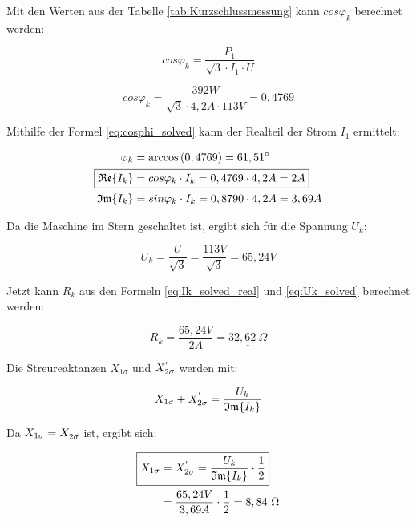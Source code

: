 \documentclass[conference]{IEEEtran}
\begin{document}
Mit den Werten aus der Tabelle \ref{tab:Kurzschlussmessung} kann $cos\varphi_k$ berechnet werden:

\begin{equation}
    \boxed{cos\varphi_k = \frac{P_1}{\sqrt{3} \cdot I_1 \cdot U}}
\end{equation}

\begin{equation} \label{eq:cosphi_solved}
    cos\varphi_k = \frac{392 W}{\sqrt{3} \cdot 4,2 A \cdot 113 V} = 0,4769
\end{equation}

Mithilfe der Formel \ref{eq:cosphi_solved} kann der Realteil der Strom $I_1$ ermittelt:

\begin{align} \label{eq:Ik_solved_real}
    \varphi_k                      & = \arccos\left(0,4769\right) = 61,51^\circ             \\
    \Aboxed{\mathfrak{Re}\{I_k\} & = cos\varphi_k \cdot I_k = 0,4769 \cdot 4,2 A = 2A}    \\
    \mathfrak{Im}\{I_k\}         & = sin\varphi_k \cdot I_k = 0,8790 \cdot 4,2 A = 3,69 A
\end{align}

Da die Maschine im Stern geschaltet ist, ergibt sich für die Spannung $U_k$:

\begin{equation} \label{eq:Uk_solved}
    \boxed{U_k = \frac{U}{\sqrt{3}}} = \frac{113 V}{\sqrt{3}} = 65,24 V
\end{equation}

Jetzt kann $R_k$ aus den Formeln \ref{eq:Ik_solved_real} und \ref{eq:Uk_solved} berechnet werden:

\begin{equation} \label{eq:Kurzschlusswiderstand_calc}
    \boxed{R_k = \frac{65,24V}{2A} = \underline{32,62\ \Omega}}
\end{equation}

Die Streureaktanzen $X_{1\sigma}$ und $X_{2\sigma}^\text{\textquotesingle}$ werden mit:

\begin{equation} \label{eq:Streureaktanzen}
    X_{1\sigma} + X_{2\sigma}^\text{\textquotesingle} = \frac{U_k}{\mathfrak{Im}\{I_k\}}
\end{equation}

Da $X_{1\sigma} = X_{2\sigma}^\text{\textquotesingle}$ ist, ergibt sich:

\begin{align} \label{eq:Streureaktanzen_solved}
    \Aboxed{X_{1\sigma} & = X_{2\sigma}^\text{\textquotesingle} = \frac{U_k}{\mathfrak{Im}\{I_k\}}\cdot\frac{1}{2}} \\
                        & = \frac{65,24V}{3,69A}\cdot\frac{1}{2} = 8,84\ \Omega
\end{align}
\end{document}
